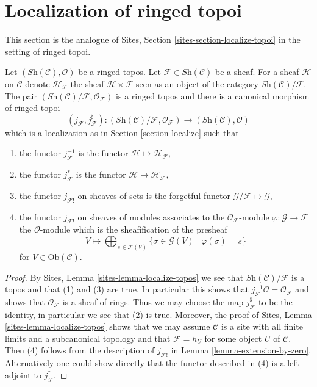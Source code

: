 \section{Localization of ringed topoi}
\label{section-localize-ringed-topoi}

\noindent
This section is the analogue of
Sites, Section \ref{sites-section-localize-topoi}
in the setting of ringed topoi.

\begin{lemma}
\label{lemma-localize-ringed-topos}
Let $(\textit{Sh}(\mathcal{C}), \mathcal{O})$ be a ringed topos.
Let $\mathcal{F} \in \textit{Sh}(\mathcal{C})$ be a sheaf.
For a sheaf $\mathcal{H}$ on $\mathcal{C}$ denote
$\mathcal{H}_{\mathcal{F}}$ the sheaf $\mathcal{H} \times \mathcal{F}$
seen as an object of the category $\textit{Sh}(\mathcal{C})/\mathcal{F}$.
The pair
$(\textit{Sh}(\mathcal{C})/\mathcal{F}, \mathcal{O}_{\mathcal{F}})$
is a ringed topos and there is a canonical morphism of ringed topoi
$$
(j_{\mathcal{F}}, j_{\mathcal{F}}^\sharp) :
(\textit{Sh}(\mathcal{C})/\mathcal{F}, \mathcal{O}_{\mathcal{F}})
\longrightarrow
(\textit{Sh}(\mathcal{C}), \mathcal{O})
$$
which is a localization as in
Section \ref{section-localize}
such that
\begin{enumerate}
\item the functor $j_{\mathcal{F}}^{-1}$ is the functor
$\mathcal{H} \mapsto \mathcal{H}_{\mathcal{F}}$,
\item the functor $j_{\mathcal{F}}^*$ is the functor
$\mathcal{H} \mapsto \mathcal{H}_{\mathcal{F}}$,
\item the functor $j_{\mathcal{F}!}$ on sheaves of sets is the forgetful
functor $\mathcal{G}/\mathcal{F} \mapsto \mathcal{G}$,
\item the functor $j_{\mathcal{F}!}$ on sheaves of modules associates
to the $\mathcal{O}_{\mathcal{F}}$-module
$\varphi : \mathcal{G} \to \mathcal{F}$ the $\mathcal{O}$-module
which is the sheafification of the presheaf
$$
V \longmapsto
\bigoplus\nolimits_{s \in \mathcal{F}(V)}
\{\sigma \in \mathcal{G}(V) \mid \varphi(\sigma) = s \}
$$
for $V \in \text{Ob}(\mathcal{C})$.
\end{enumerate}
\end{lemma}

\begin{proof}
By
Sites, Lemma \ref{sites-lemma-localize-topos}
we see that $\textit{Sh}(\mathcal{C})/\mathcal{F}$ is a topos
and that (1) and (3) are true. In particular this shows that
$j_{\mathcal{F}}^{-1}\mathcal{O} = \mathcal{O}_{\mathcal{F}}$
and shows that $\mathcal{O}_{\mathcal{F}}$ is a sheaf of rings.
Thus we may choose the map $j_{\mathcal{F}}^\sharp$ to be the identity,
in particular we see that (2) is true.
Moreover, the proof of
Sites, Lemma \ref{sites-lemma-localize-topos}
shows that we may assume $\mathcal{C}$ is a site with all finite limits
and a subcanonical topology and that $\mathcal{F} = h_U$ for some object
$U$ of $\mathcal{C}$.
Then (4) follows from the description of $j_{\mathcal{F}!}$ in
Lemma \ref{lemma-extension-by-zero}.
Alternatively one could show directly that the functor described
in (4) is a left adjoint to $j_{\mathcal{F}}^*$.
\end{proof}

